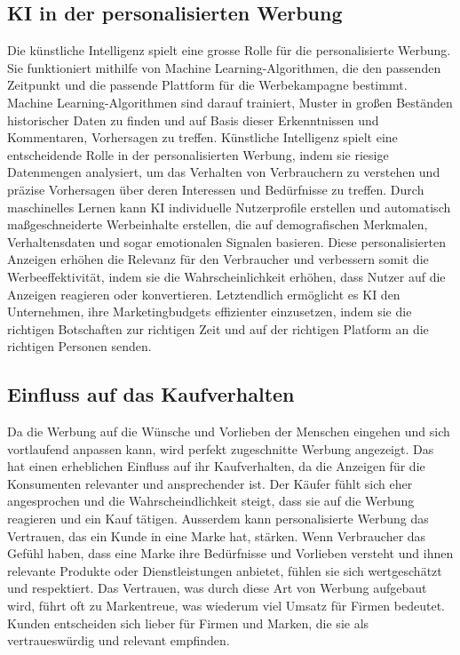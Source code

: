 \documentclass{article}
\begin{document}
 \subsection{KI in der personalisierten Werbung}

 Die künstliche Intelligenz spielt eine grosse Rolle für die personalisierte Werbung. Sie funktioniert mithilfe von Machine Learning-Algorithmen, die den passenden Zeitpunkt und die passende Plattform für die Werbekampagne bestimmt. Machine Learning-Algorithmen sind darauf trainiert, Muster in großen Beständen historischer Daten zu finden und auf Basis dieser Erkenntnissen und Kommentaren, Vorhersagen zu treffen.
 Künstliche Intelligenz spielt eine entscheidende Rolle in der personalisierten Werbung, indem sie riesige Datenmengen analysiert, um das Verhalten von Verbrauchern zu verstehen und präzise Vorhersagen über deren Interessen und Bedürfnisse zu treffen. Durch maschinelles Lernen kann KI individuelle Nutzerprofile erstellen und automatisch maßgeschneiderte Werbeinhalte erstellen, die auf demografischen Merkmalen, Verhaltensdaten und sogar emotionalen Signalen basieren. Diese personalisierten Anzeigen erhöhen die Relevanz für den Verbraucher und verbessern somit die Werbeeffektivität, indem sie die Wahrscheinlichkeit erhöhen, dass Nutzer auf die Anzeigen reagieren oder konvertieren. Letztendlich ermöglicht es KI den Unternehmen, ihre Marketingbudgets effizienter einzusetzen, indem sie die richtigen Botschaften zur richtigen Zeit und auf der richtigen Platform an die richtigen Personen senden.

 \subsection{Einfluss auf das Kaufverhalten}
Da die Werbung auf die Wünsche und Vorlieben der Menschen eingehen und sich vortlaufend anpassen kann, wird perfekt zugeschnitte Werbung angezeigt. Das hat einen erheblichen Einfluss auf ihr Kaufverhalten, da die Anzeigen für die Konsumenten relevanter und ansprechender ist. Der Käufer fühlt sich eher angesprochen und die Wahrscheindlichkeit steigt, dass sie auf die Werbung reagieren und ein Kauf tätigen. Ausserdem kann personalisierte Werbung das Vertrauen, das ein Kunde in eine Marke hat, stärken. Wenn Verbraucher das Gefühl haben, dass eine Marke ihre Bedürfnisse und Vorlieben versteht und ihnen relevante Produkte oder Dienstleistungen anbietet, fühlen sie sich wertgeschätzt und respektiert. Das Vertrauen, was durch diese Art von Werbung aufgebaut wird, führt oft zu Markentreue, was wiederum viel Umsatz für Firmen bedeutet. Kunden entscheiden sich lieber für Firmen und Marken, die sie als vertraueswürdig und relevant empfinden. 
\end{document}

